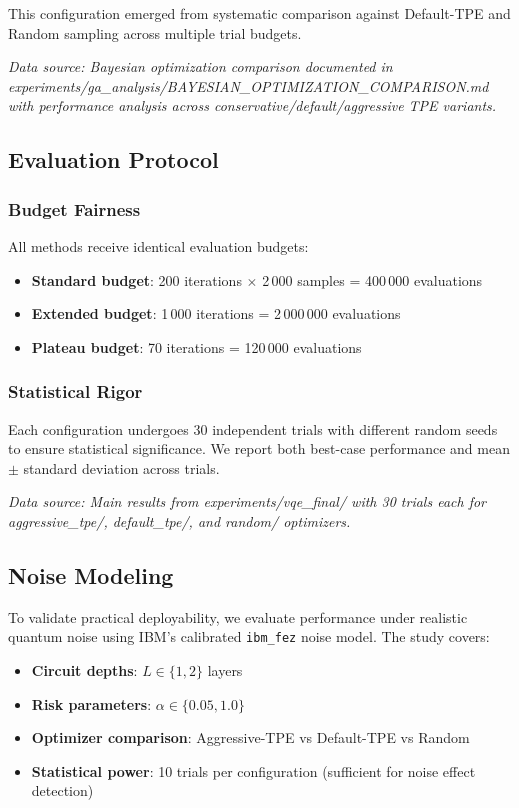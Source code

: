 This configuration emerged from systematic comparison against Default-TPE and Random sampling across multiple trial budgets.

\textit{Data source: Bayesian optimization comparison documented in experiments/ga\_analysis/BAYESIAN\_OPTIMIZATION\_COMPARISON.md with performance analysis across conservative/default/aggressive TPE variants.}

\subsection{Evaluation Protocol}

\subsubsection{Budget Fairness}
All methods receive identical evaluation budgets:
\begin{itemize}
    \item \textbf{Standard budget}: 200 iterations $\times$ 2\,000 samples = 400\,000 evaluations
    \item \textbf{Extended budget}: 1\,000 iterations = 2\,000\,000 evaluations  
    \item \textbf{Plateau budget}: 70 iterations = 120\,000 evaluations
\end{itemize}

\subsubsection{Statistical Rigor}
Each configuration undergoes 30 independent trials with different random seeds to ensure statistical significance.
We report both best-case performance and mean $\pm$ standard deviation across trials.

\textit{Data source: Main results from experiments/vqe\_final/ with 30 trials each for aggressive\_tpe/, default\_tpe/, and random/ optimizers.}

\subsection{Noise Modeling}

To validate practical deployability, we evaluate performance under realistic quantum noise using IBM's calibrated \texttt{ibm\_fez} noise model.
The study covers:
\begin{itemize}[nosep]
    \item \textbf{Circuit depths}: $L \in \{1, 2\}$ layers
    \item \textbf{Risk parameters}: $\alpha \in \{0.05, 1.0\}$  
    \item \textbf{Optimizer comparison}: Aggressive-TPE vs Default-TPE vs Random
    \item \textbf{Statistical power}: 10 trials per configuration (sufficient for noise effect detection)
\end{itemize}

